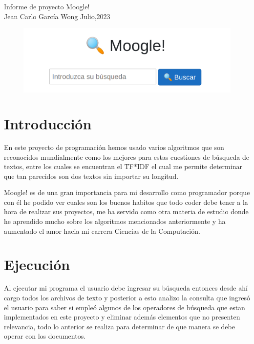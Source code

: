\documentclass[a4paper,12pt]{article}
\begin{document}
\begin{titlepage}
\begin{center}
{\Huge Informe de proyecto Moogle!}\\
\vspace{0.5cm}
{\Large Jean Carlo García Wong}
{\large Julio,2023}
\begin{figure}[h]
    \center{}
    \includegraphics[width=12cm]{moogle.png}
\end{figure}
\end{center}
\end{titlepage}
\restoregeometry

\newpage
\begin{abstract}
    Moogle! 
    es un buscador de texto en el cual el usuario puede realizar
    una búsqueda inteligente entre varios textos de contenidos
    diversos ya sea con fines investigativos o solo por curiosidad 
    de una manera sencilla y eficaz.
\end{abstract}

\section{Introducción}\label{sec:intro}
    En este proyecto de programación hemos usado varios algoritmos
    que son reconocidos mundialmente como los mejores para estas 
    cuestiones de búsqueda de textos, entre los cuales se encuentran
    el TF*IDF el cual me permite determinar que tan parecidos son dos textos sin importar su longitud.

    Moogle! es de una gran importancia para mi desarrollo como programador
    porque con él he podido ver cuales son los buenos habitos que todo coder
    debe tener a la hora de realizar sus proyectos, me ha servido como otra
    materia de estudio donde he aprendido mucho sobre los algoritmos mencionados
    anteriormente y ha aumentado el amor hacia mi carrera Ciencias de la Computación.
    
    \newpage
    \section{Ejecución}
    Al ejecutar mi programa el usuario debe ingresar su búsqueda entonces desde
    ahí cargo todos los archivos de texto y posterior a esto analizo la consulta
    que ingresó el usuario para saber si empleó algunos de los operadores de búsqueda
    que estan implementados en este proyecto y eliminar además elementos que no presenten
    relevancia, todo lo anterior se realiza para determinar de que manera se debe operar
    con los documentos.
\end{document}

